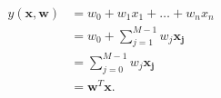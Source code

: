 \begin{equation}
\label{eq:standardlinearregression}
\begin{align*}
y(\mathbf{x, w}) &= w_0 + w_1 x_1 + \ldots + w_n x_n \\
				 &= w_0 + \sum_{j = 1}^{M - 1}{w_j \mathbf{x_j}} \\
				 &= \sum_{j = 0}^{M - 1}{w_j \mathbf{x_j}} \\
				 &= \mathbf{w}^T \mathbf{x} .
\end{align*}
\end{equation}
